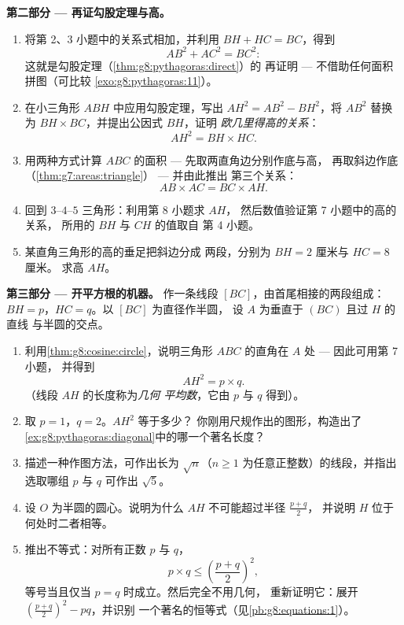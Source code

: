 \begin{problem}[{周末问题 --- 直角三角形的高：
$AB^2 = BH \times BC$，$AH^2 = BH \times HC$，勾股定理的第二种证明，
以及开平方根的机器}]
\medskip
\noindent\textbf{第二部分 --- 再证勾股定理与高。}
\begin{enumerate}[resume]
  \item 将第 2、3 小题中的关系式相加，并利用
        $BH + HC = BC$，得到
        \[
        AB^2 + AC^2 = BC^2 :
        \]
        这就是勾股定理（\cref{thm:g8:pythagoras:direct}）的
        再证明 --- 不借助任何面积拼图（可比较
        \cref{exo:g8:pythagoras:11}）。
  \item 在小三角形 $ABH$ 中应用勾股定理，写出
        $AH^2 = AB^2 - BH^2$，将 $AB^2$ 替换为
        $BH \times BC$，并提出公因式 $BH$，证明
        \emph{欧几里得高的关系}：
        \[
        AH^2 = BH \times HC .
        \]
  \item 用两种方式计算 $ABC$ 的面积 --- 先取两直角边分别作底与高，
        再取斜边作底
        （\cref{thm:g7:areas:triangle}） --- 并由此推出
        第三个关系：
        \[
        AB \times AC = BC \times AH .
        \]
  \item 回到 $3$--$4$--$5$ 三角形：利用第 8 小题求 $AH$，
        然后数值验证第 7 小题中的高的关系，
        所用的 $BH$ 与 $CH$ 的值取自
        第 4 小题。
  \item 某直角三角形的高的垂足把斜边分成
        两段，分别为 $BH = 2$ 厘米与 $HC = 8$ 厘米。
        求高 $AH$。
\end{enumerate}

\medskip
\noindent\textbf{第三部分 --- 开平方根的机器。}
作一条线段 $[BC]$，由首尾相接的两段组成：
$BH = p$，$HC = q$。以 $[BC]$ 为直径作半圆，
设 $A$ 为垂直于 $(BC)$ 且过 $H$ 的直线
与半圆的交点。
\begin{enumerate}[resume]
  \item 利用\cref{thm:g8:cosine:circle}，说明三角形
        $ABC$ 的直角在 $A$ 处 --- 因此可用第 7 小题，
        并得到
        \[
        AH^2 = p \times q .
        \]
        （线段 $AH$ 的长度称为\emph{几何
        平均数}，它由 $p$ 与 $q$ 得到）。
  \item 取 $p = 1$，$q = 2$。$AH^2$ 等于多少？
        你刚用尺规作出的图形，构造出了
        \cref{ex:g8:pythagoras:diagonal}中的哪一个著名长度？
  \item 描述一种作图方法，可作出长为
        $\sqrt n$（$n \geq 1$ 为任意正整数）的线段，并指出
        选取哪组 $p$ 与 $q$ 可作出 $\sqrt 5$。
  \item 设 $O$ 为半圆的圆心。说明为什么
        $AH$ 不可能超过半径 $\frac{p + q}{2}$，
        并说明 $H$ 位于何处时二者相等。
  \item 推出不等式：对所有正数
        $p$ 与 $q$，
        \[
        p \times q \leq \left(\frac{p + q}{2}\right)^2,
        \]
        等号当且仅当 $p = q$ 时成立。然后完全不用几何，
        重新证明它：展开
        $\left(\frac{p+q}{2}\right)^2 - p q$，并识别
        一个著名的恒等式（见\cref{pb:g8:equations:1}）。
\end{enumerate}
\end{problem}
